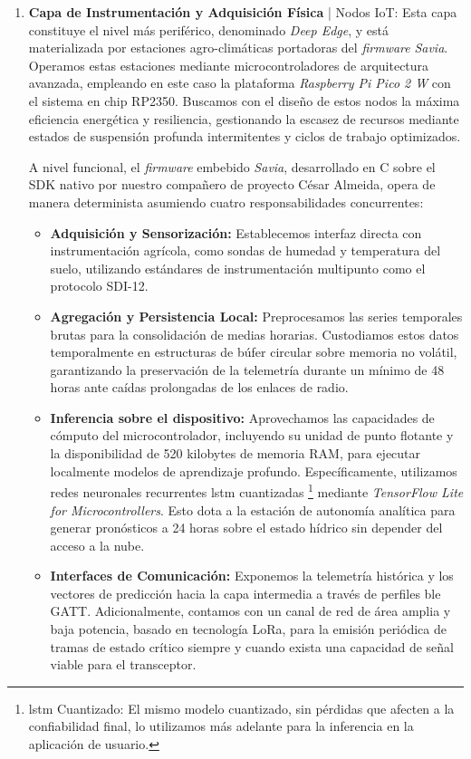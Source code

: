 \begin{enumerate}
    \item \textbf{Capa de Instrumentación y Adquisición Física} | Nodos IoT: Esta capa constituye el nivel más periférico, denominado \textit{Deep Edge}, y está materializada por estaciones agro-climáticas portadoras del \textit{firmware} \textit{Savia}. Operamos estas estaciones mediante microcontroladores de arquitectura avanzada, empleando en este caso la plataforma \textit{Raspberry Pi Pico 2 W} con el sistema en chip RP2350. Buscamos con el diseño de estos nodos la máxima eficiencia energética y resiliencia, gestionando la escasez de recursos mediante estados de suspensión profunda intermitentes y ciclos de trabajo optimizados.
    
    A nivel funcional, el \textit{firmware} embebido \textit{Savia}, desarrollado en C sobre el SDK nativo por nuestro compañero de proyecto César Almeida, opera de manera determinista asumiendo cuatro responsabilidades concurrentes:
    \begin{itemize}
        \item \textbf{Adquisición y Sensorización:} Establecemos interfaz directa con instrumentación agrícola, como sondas de humedad y temperatura del suelo, utilizando estándares de instrumentación multipunto como el protocolo SDI-12.
        \item \textbf{Agregación y Persistencia Local:} Preprocesamos las series temporales brutas para la consolidación de medias horarias. Custodiamos estos datos temporalmente en estructuras de búfer circular sobre memoria no volátil, garantizando la preservación de la telemetría durante un mínimo de 48 horas ante caídas prolongadas de los enlaces de radio.
        \item \textbf{Inferencia sobre el dispositivo:} Aprovechamos las capacidades de cómputo del microcontrolador, incluyendo su unidad de punto flotante y la disponibilidad de 520 kilobytes de memoria RAM, para ejecutar localmente modelos de aprendizaje profundo. Específicamente, utilizamos redes neuronales recurrentes \gls{lstm} cuantizadas \footnote{\gls{lstm} Cuantizado: El mismo modelo cuantizado, sin pérdidas que afecten a la confiabilidad final, lo utilizamos más adelante para la inferencia en la aplicación de usuario.} mediante \textit{TensorFlow Lite for Microcontrollers}. Esto dota a la estación de autonomía analítica para generar pronósticos a 24 horas sobre el estado hídrico sin depender del acceso a la nube.
        \item \textbf{Interfaces de Comunicación:} Exponemos la telemetría histórica y los vectores de predicción hacia la capa intermedia a través de perfiles \gls{ble} GATT. Adicionalmente, contamos con un canal de red de área amplia y baja potencia, basado en tecnología LoRa, para la emisión periódica de tramas de estado crítico siempre y cuando exista una capacidad de señal viable para el transceptor.
    \end{itemize}
    

\end{enumerate}
